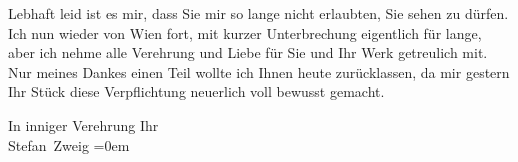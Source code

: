 \pstart
           Lebhaft leid ist es mir, dass Sie mir so lange nicht erlaubten, Sie sehen zu dürfen.
               Ich \label{K_L03646-2v}\label{K_L03646-2} nun {\pb}wieder von Wien fort, mit kurzer Unterbrechung eigentlich für
               lange, aber ich nehme alle Verehrung und Liebe für Sie und Ihr Werk getreulich mit.
               Nur meines Dankes einen Teil wollte ich Ihnen heute zurücklassen, da mir
               gestern Ihr Stück diese Verpflichtung neuerlich voll bewusst gemacht.\pend
           
\pstart
           In inniger Verehrung Ihr{\\[\baselineskip]}\spacefill\mbox{Stefan Zweig}\pend
           \leftskip=0em{}\endnumbering{}  \newcommand{\dateiname}{L03646}\newcommand{\titel}{Stefan Zweig an Arthur Schnitzler, 20. 2. 1914}\newcommand{\editorInnen}{Selma Jahnke und Martin Anton Müller}

